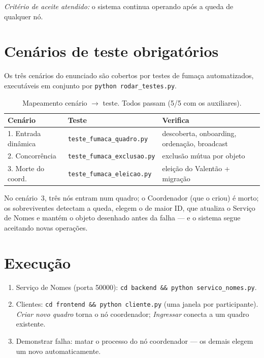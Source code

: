 \emph{Critério de aceite atendido:} o sistema continua operando após a queda de qualquer
nó.

\section{Cenários de teste obrigatórios}
\label{sec:testes}

Os três cenários do enunciado são cobertos por testes de fumaça automatizados, executáveis
em conjunto por \texttt{python rodar\_testes.py}.

\begin{table}[H]
  \centering
  \begin{tabular}{@{}lll@{}}
    \toprule
    \textbf{Cenário} & \textbf{Teste} & \textbf{Verifica} \\
    \midrule
    1. Entrada dinâmica & \texttt{teste\_fumaca\_quadro.py} & descoberta, onboarding, ordenação, broadcast \\
    2. Concorrência     & \texttt{teste\_fumaca\_exclusao.py} & exclusão mútua por objeto \\
    3. Morte do coord.  & \texttt{teste\_fumaca\_eleicao.py} & eleição do Valentão + migração \\
    \bottomrule
  \end{tabular}
  \caption{Mapeamento cenário $\rightarrow$ teste. Todos passam (5/5 com os auxiliares).}
\end{table}

No cenário~3, três nós entram num quadro; o Coordenador (que o criou) é morto; os
sobreviventes detectam a queda, elegem o de maior ID, que atualiza o Serviço de Nomes e
mantém o objeto desenhado antes da falha --- e o sistema segue aceitando novas operações.

\section{Execução}
\label{sec:execucao}

\begin{enumerate}
  \item Serviço de Nomes (porta 50000): \texttt{cd backend \&\& python servico\_nomes.py}.
  \item Clientes: \texttt{cd frontend \&\& python cliente.py} (uma janela por participante).
        \emph{Criar novo quadro} torna o nó coordenador; \emph{Ingressar} conecta a um
        quadro existente.
  \item Demonstrar falha: matar o processo do nó coordenador --- os demais elegem um novo
        automaticamente.
\end{enumerate}
